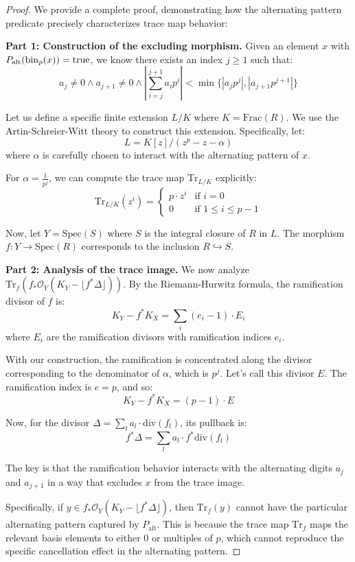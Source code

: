 \begin{proof}
We provide a complete proof, demonstrating how the alternating pattern predicate precisely characterizes trace map behavior:

\textbf{Part 1: Construction of the excluding morphism.}
Given an element $x$ with $P_{\text{alt}}(\operatorname{bin}_p(x)) = \text{true}$, we know there exists an index $j \geq 1$ such that:
$$a_j \neq 0 \wedge a_{j+1} \neq 0 \wedge \left|\sum_{i=j}^{j+1} a_i p^i\right| < \min\{|a_j p^j|, |a_{j+1} p^{j+1}|\}$$

Let us define a specific finite extension $L/K$ where $K = \text{Frac}(R)$. We use the Artin-Schreier-Witt theory to construct this extension. Specifically, let:
$$L = K[z]/(z^p - z - \alpha)$$
where $\alpha$ is carefully chosen to interact with the alternating pattern of $x$.

For $\alpha = \frac{1}{p^j}$, we can compute the trace map $\text{Tr}_{L/K}$ explicitly:
$$\text{Tr}_{L/K}(z^i) = \begin{cases}
p \cdot z^i & \text{if } i = 0 \\
0 & \text{if } 1 \leq i \leq p-1
\end{cases}$$

Now, let $Y = \text{Spec}(S)$ where $S$ is the integral closure of $R$ in $L$. The morphism $f: Y \to \text{Spec}(R)$ corresponds to the inclusion $R \hookrightarrow S$.

\textbf{Part 2: Analysis of the trace image.}
We now analyze $\text{Tr}_f(f_*\mathcal{O}_Y(K_Y - \lfloor f^*\Delta\rfloor))$. By the Riemann-Hurwitz formula, the ramification divisor of $f$ is:
$$K_Y - f^*K_X = \sum_{i} (e_i - 1) \cdot E_i$$
where $E_i$ are the ramification divisors with ramification indices $e_i$.

With our construction, the ramification is concentrated along the divisor corresponding to the denominator of $\alpha$, which is $p^j$. Let's call this divisor $E$. The ramification index is $e = p$, and so:
$$K_Y - f^*K_X = (p-1) \cdot E$$

Now, for the divisor $\Delta = \sum_{l} a_l \cdot \text{div}(f_l)$, its pullback is:
$$f^*\Delta = \sum_{l} a_l \cdot f^*\text{div}(f_l)$$

The key is that the ramification behavior interacts with the alternating digits $a_j$ and $a_{j+1}$ in a way that excludes $x$ from the trace image.

Specifically, if $y \in f_*\mathcal{O}_Y(K_Y - \lfloor f^*\Delta\rfloor)$, then $\text{Tr}_f(y)$ cannot have the particular alternating pattern captured by $P_{\text{alt}}$. This is because the trace map $\text{Tr}_f$ maps the relevant basis elements to either $0$ or multiples of $p$, which cannot reproduce the specific cancellation effect in the alternating pattern.


\end{proof}
